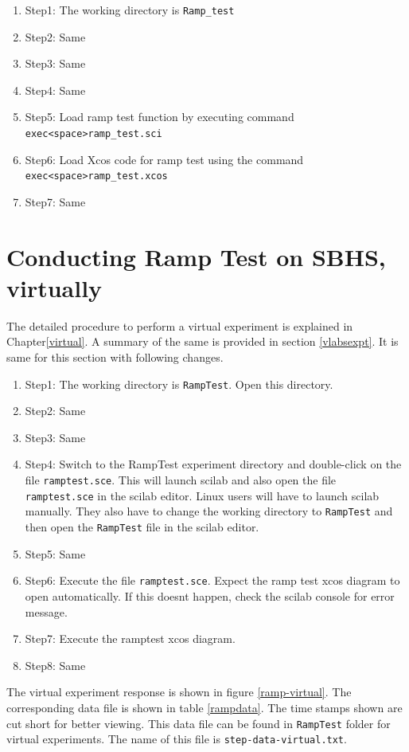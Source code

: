 \begin{enumerate}
\item Step1: The working directory is {\tt  Ramp\_test}
\item Step2: Same
\item Step3: Same
\item Step4: Same
\item Step5: Load ramp test function by executing command\\ {\tt exec<space>ramp\_test.sci}
\item Step6: Load Xcos code for ramp test using the command\\ {\tt exec<space>ramp\_test.xcos}
\item Step7: Same
\end{enumerate}
\section{Conducting Ramp Test on SBHS, virtually}
The detailed procedure to perform a virtual experiment is explained in Chapter\ref{virtual}. A summary of the same is provided in section \ref{vlabsexpt}. It is same for this section with following changes.

\begin{enumerate}
\item Step1: The working directory is {\tt  RampTest}. Open this directory.
\item Step2: Same
\item Step3: Same
\item Step4:  Switch to the RampTest experiment directory and double-click on the file {\tt ramptest.sce}. This will launch scilab and also open the file {\tt ramptest.sce} in the scilab editor. Linux users will have to launch scilab manually. They also have to change the working directory to {\tt  RampTest} and then open the {\tt  RampTest} file in the scilab editor.
\item Step5: Same
\item Step6: Execute the file {\tt ramptest.sce}.  Expect the ramp test xcos diagram to open automatically. If this doesnt happen, check the scilab console for error message.
\item Step7: Execute the ramptest xcos diagram.
\item Step8: Same
\end{enumerate}


 The virtual experiment response is shown in figure \ref{ramp-virtual}. The corresponding data file is shown in table \ref{rampdata}. The time stamps shown are cut short for better viewing. This data file can be found in {\tt RampTest} folder for virtual experiments. The name of this file is {\tt step-data-virtual.txt}.



